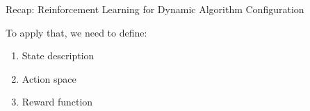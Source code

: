 \begin{frame}[c]{Recap: Reinforcement Learning for Dynamic Algorithm Configuration}

\begin{center}

\end{center}

\bigskip
To apply that, we need to define:
\begin{enumerate}
	\item State description
	\item Action space
	\item Reward function
\end{enumerate}

\end{frame}

